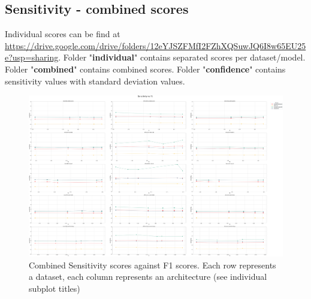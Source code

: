 \subsection{Sensitivity - combined scores}\label{appendix:combined-sens}

Individual scores can be find at \url{https://drive.google.com/drive/folders/12eYJSZFMfI2FZhXQSuwJQ6I8w65EU25e?usp=sharing}. Folder "\textbf{individual}" contains separated scores per dataset/model. Folder "\textbf{combined}" contains combined scores. Folder "\textbf{confidence}" contains sensitivity values with standard deviation values.

\begin{figure}[ht]
  \centering
  \includegraphics[width=\textwidth]{appendixes/images/sensitivity-combined-f1.png}
  \caption{Combined Sensitivity scores against F1 scores. Each row represents a dataset, each column represents an architecture (see individual subplot titles)}\label{fig:combined-sensitivity}
\end{figure}

